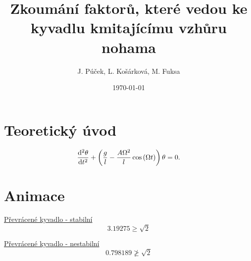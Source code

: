 \documentclass{beamer}
\title[Převrácené kyvadlo]{Zkoumání faktorů, které vedou ke kyvadlu kmitajícímu vzhůru nohama}
\author[J. P., L. K., M. F.]{J. Púček, L. Košárková, M. Fuksa}
\institute[Univerzita Karlova]{Univerzita Karlova, Česká republika}
\date{\today}
\begin{document}
\begin{frame}
\titlepage
\end{frame}

\section{Teoretický úvod}
\label{sec:uvod}

\begin{frame}
\begin{equation*}
  \frac{\mathrm{d}^2 {\theta}}{\mathrm{d} {t}^2}
  +
  \left(
    \frac{g}{l}
    -
    \frac{A \Omega^2}{l} \cos \left( \Omega t \right)
  \right)
  \theta
  =
  0
  .
\end{equation*}
\end{frame}

\section{Animace}
\label{sec:animace}

\begin{frame}
\begin{center}
\href{run:./animace.mp4}{Převrácené kyvadlo - stabilní}
\begin{equation*}
3.19275 \geq \sqrt{2}
\end{equation*}
\end{center}
\end{frame}

\begin{frame}
\begin{center}
\href{run:./animace2.mp4}{Převrácené kyvadlo - nestabilní}
\begin{equation*}
0.798189 \ngeq \sqrt{2}
\end{equation*}
\end{center}
\end{frame}
\end{document}
